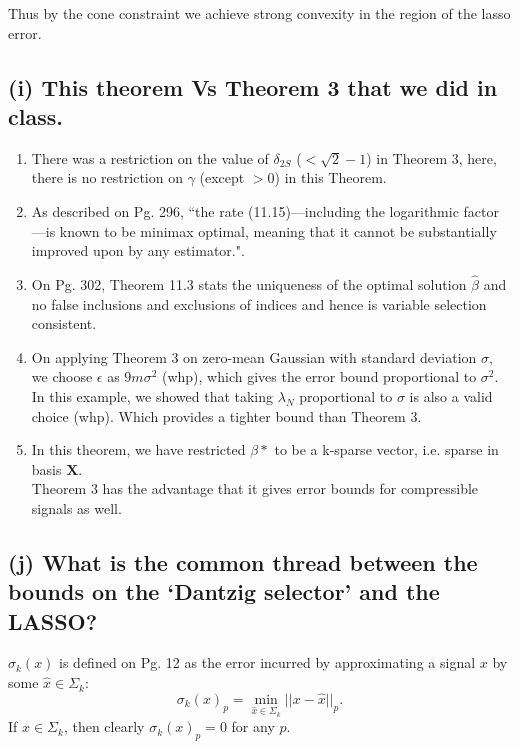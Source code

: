 \documentclass[fleqn, 11pt]{article}
\begin{document}
Thus by the cone constraint we achieve strong convexity in the region of the lasso error.

\bigskip


\newpage
\subsection*{(i)  This theorem Vs Theorem 3 that we did in class.}
\begin{enumerate}
    \item There was a restriction on the value of $\delta_{2S}$ ($< \sqrt{2} - 1$) in Theorem 3, here, there is no restriction on $\gamma$ (except $> 0$) in this Theorem.
    \item As described on Pg. 296, ``the rate (11.15)—including the logarithmic factor—is known to be minimax optimal, meaning that it cannot be substantially improved upon by any estimator.".
    \item On Pg. 302, Theorem 11.3 stats the uniqueness of the optimal solution $\hat{\beta}$ and no false inclusions and exclusions of indices and hence is variable selection consistent.
    \item On applying Theorem 3 on zero-mean Gaussian with standard deviation $\sigma$, we choose $\epsilon$ as $9m\sigma^2$ (whp), which gives the error bound proportional to $\sigma^2$.\\
    In this example, we showed that taking $\lambda_N$ proportional to $\sigma$ is also a valid choice (whp). Which provides a tighter bound than Theorem 3.
    \item In this theorem, we have restricted $\beta*$ to be a k-sparse vector, i.e. sparse in basis $\mathbf{X}$. \\
    Theorem 3 has the advantage that it gives error bounds for compressible signals as well.
\end{enumerate}

\bigskip


\subsection*{(j) What is the common thread between the bounds on the `Dantzig selector' and the LASSO?}

$\sigma_k(x)$ is defined on Pg. 12 as the error incurred by approximating a signal $x$ by some $\hat{x} \in \Sigma_k$: $$\sigma_k (x)_p = \min_{\hat{x} \in \Sigma_k} ||x - \hat{x}||_p.$$
If $x \in \Sigma_k$, then clearly $\sigma_k (x)_p = 0$ for any $p$.\\
\end{document}
